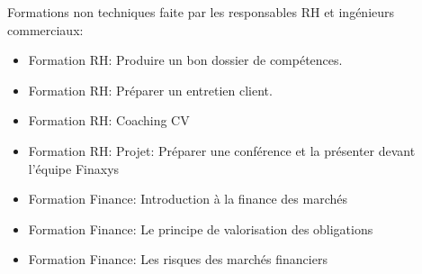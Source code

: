 Formations non techniques faite par les responsables RH et ingénieurs commerciaux:
\begin{itemize}  
    \item Formation RH: Produire un bon dossier de compétences.
    \item Formation RH: Préparer un entretien client.
    \item Formation RH: Coaching CV
    \item Formation RH: Projet: Préparer une conférence et la présenter devant l'équipe Finaxys
    \item Formation Finance: Introduction à la finance des marchés
    \item Formation Finance: Le principe de valorisation des obligations
    \item Formation Finance: Les risques des marchés financiers
\end{itemize}